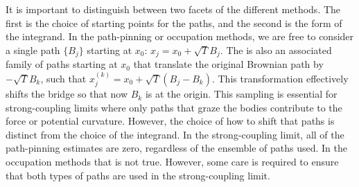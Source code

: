 
It is important to distinguish between two facets of the different methods.
The first is the choice of starting points for the paths, and the second is the form of the integrand.
In the path-pinning or occupation methods, we are free to consider a single path $\{B_j\}$ starting at $x_0$: $x_j=x_0+\sqrt{T}B_j$.
The is also an associated family of paths starting at $x_0$ that translate the original Brownian path
by $-\sqrt{T}B_k$, such that $x^{(k)}_j = x_0+\sqrt{T}(B_j-B_k)$.  This transformation effectively shifts the bridge so that now 
$B_k$ is at the origin.  This sampling is essential for strong-coupling limits where only paths that graze 
the bodies contribute to the force or potential curvature.  
However, the choice of how to shift that paths is distinct from the choice of the integrand.
In the strong-coupling limit, all of the path-pinning estimates are zero, regardless of the ensemble of paths used.  
In the occupation methods that is not true.  However, some care is required to ensure that both types of paths are 
used in the strong-coupling limit.  





